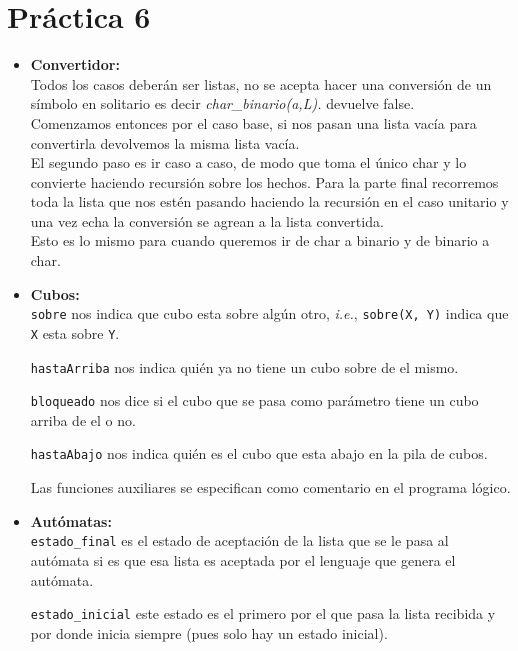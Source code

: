 \documentclass{article}
\newcommand{\code}[1]{\textcolor{white!25!black}{\texttt{#1}}}
\begin{document}
\section*{\LARGE{Práctica 6}}
\newcommand{\localtextbulletone}{\textcolor{black}{\raisebox{.45ex}{\rule{.6ex}{.6ex}}}}
\renewcommand{\labelitemi}{\localtextbulletone}
\begin{itemize}
\item \textbf{Convertidor:}\\
  Todos los casos deberán ser listas, no se acepta hacer una conversión de un símbolo en solitario es decir \textit{char\_binario(a,L).} devuelve false.\\
  Comenzamos entonces por el caso base, si nos pasan una lista vacía para convertirla devolvemos la misma lista vacía.\\
  El segundo paso es ir caso a caso, de modo que toma el único char y lo convierte haciendo recursión sobre los hechos. Para la parte final recorremos toda la lista que nos estén pasando haciendo la recursión en el caso unitario y una vez echa la conversión se agrean a la lista convertida. \\
  Esto es lo mismo para cuando queremos ir de char a binario y de binario a char. 
  
\item \textbf{Cubos:}\\
  \code{sobre} nos indica que cubo esta sobre algún otro, \textit{i.e.}, \code{sobre(X, Y)} indica que \code{X}
  esta sobre \code{Y}.

  \code{hastaArriba} nos indica quién ya no tiene un cubo sobre de el mismo.

  \code{bloqueado} nos dice si el cubo que se pasa como parámetro tiene un cubo arriba de el o no.

  \code{hastaAbajo} nos indica quién es el cubo que esta abajo en la pila de cubos.

  Las funciones auxiliares se especifican como comentario en el programa lógico.
\item \textbf{Autómatas:}\\
  \code{estado\_final} es el estado de aceptación de la lista que se le pasa al autómata si es que esa lista
  es aceptada por el lenguaje que genera el autómata.

  \code{estado\_inicial} este estado es el primero por el que pasa la lista recibida y por donde inicia siempre
  (pues solo hay un estado inicial).


\end{itemize}
\end{document}
